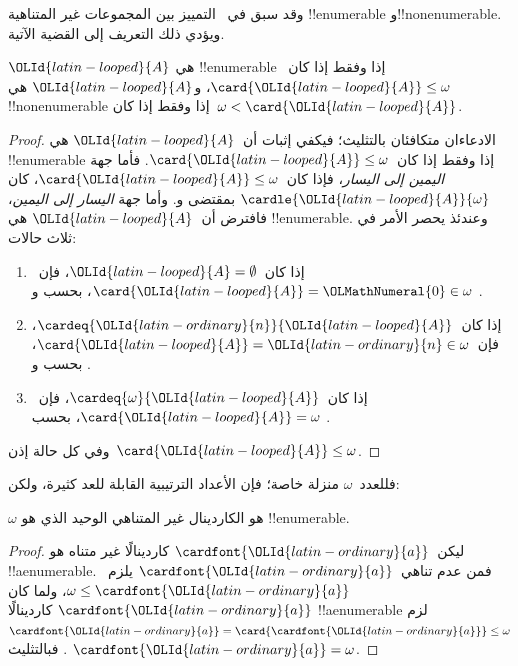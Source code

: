 \documentclass[../../../include/open-logic-section]{subfiles}
\begin{document}
وقد سبق في~ التمييز بين
المجموعات غير المتناهية !!{enumerable} و!!{nonenumerable}. ويؤدي ذلك
التعريف إلى القضية الآتية.

\begin{prop}
${\OLId{latin-looped}{A}}$ هي !!{enumerable} إذا وفقط إذا كان~$\card{{\OLId{latin-looped}{A}}} \leq \omega$، و${\OLId{latin-looped}{A}}$
هي !!{nonenumerable} إذا وفقط إذا كان~$\omega < \card{{\OLId{latin-looped}{A}}}$.
\end{prop}

\begin{proof}
الادعاءان متكافئان بالتثليث؛ فيكفي إثبات أن~${\OLId{latin-looped}{A}}$ هي !!{enumerable}
إذا وفقط إذا كان~$\card{{\OLId{latin-looped}{A}}} \leq \omega$. فأما جهة
\emph{اليمين إلى اليسار}، فإذا كان~$\card{{\OLId{latin-looped}{A}}} \leq \omega$، كان
$\cardle{{\OLId{latin-looped}{A}}}{\omega}$ بمقتضى
و. وأما جهة \emph{اليسار إلى اليمين}،
فافترض أن~${\OLId{latin-looped}{A}}$ هي !!{enumerable}. وعندئذ يحصر
 الأمر في ثلاث حالات:
\begin{enumerate}
	\item إذا كان~${\OLId{latin-looped}{A}} = \emptyset$، فإن~$\card{{\OLId{latin-looped}{A}}} = {\OLMathNumeral{0}} \in \omega$، بحسب
	 و
	.
	\item إذا كان~$\cardeq{{\OLId{latin-ordinary}{n}}}{{\OLId{latin-looped}{A}}}$، فإن~$\card{{\OLId{latin-looped}{A}}} = {\OLId{latin-ordinary}{n}} \in \omega$، بحسب
	 و
	.
	\item إذا كان~$\cardeq{\omega}{{\OLId{latin-looped}{A}}}$، فإن~$\card{{\OLId{latin-looped}{A}}} = \omega$، بحسب
	.
\end{enumerate}
وفي كل حالة إذن~$\card{{\OLId{latin-looped}{A}}} \leq \omega$.
\end{proof}
\noindent
فللعدد~$\omega$ منزلة خاصة؛ فإن الأعداد الترتيبية القابلة للعد كثيرة،
ولكن:

\begin{cor}
$\omega$ هو الكاردينال غير المتناهي الوحيد الذي هو !!{enumerable}.
\end{cor}

\begin{proof}
ليكن~$\cardfont{{\OLId{latin-ordinary}{a}}}$ كاردينالًا غير متناه هو !!a{enumerable}. فمن عدم
تناهي~$\cardfont{{\OLId{latin-ordinary}{a}}}$ يلزم~$\omega \leq \cardfont{{\OLId{latin-ordinary}{a}}}$، ولما كان
$\cardfont{{\OLId{latin-ordinary}{a}}}$ كاردينالًا !!a{enumerable} لزم
$\cardfont{{\OLId{latin-ordinary}{a}}} = \card{\cardfont{{\OLId{latin-ordinary}{a}}}} \leq \omega$. فبالتثليث
$\cardfont{{\OLId{latin-ordinary}{a}}} = \omega$.
\end{proof}
\end{document}
